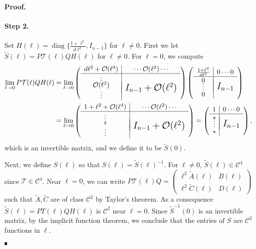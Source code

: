 \documentclass[letterpaper,11pt]{article}
\newcommand{\rmO}{\mathcal{O}}
\newcommand{\diag}{\operatorname{diag}}
\numberwithin{equation}{section}
\theoremstyle{plain}
\theoremstyle{remark}
\newenvironment{Proof}[1][.]%
 {\begin{trivlist}\item[]\textbf{Proof#1 }}%
 {\hspace*{\fill}$\rule{0.3\baselineskip}{0.35\baselineskip}$\end{trivlist}}
\begin{document}
\begin{Proof}
\paragraph{Step 2.} Set $
H(\ell) = \diag\{\frac{1+\ell^2}{d\ell^2}, I_{n-1}\}$ for $\ell \neq 0$. First we let $\tilde{S}(\ell) = P\mathcal{T}(\ell)Q H(\ell) $
for $\ell \neq 0$. For $\ell = 0$, we compute
\begin{align*}
\lim_{\ell \to 0} P\mathcal{T}(\ell)QH(\ell) &=\lim_{\ell \to 0} \left(
\begin{array}{c|c}
  d\ell^2+\rmO(\ell^4) &  \cdots \rmO(\ell^2)\cdots \\ \hline
  \vdots & \raisebox{-10pt}{{\Large\mbox{{$I_{n-1}+\rmO(\ell^2)$}}}} \\[-4ex]
  \rmO(\ell^2) & \\[-0.5ex]
  \vdots &
\end{array}\right)\left(
\begin{array}{c|c}
  \frac{1+\ell^2}{d\ell^2} & 0 \cdots 0 \\ \hline
  0 & \raisebox{-10pt}{{\Large\mbox{{$I_{n-1}$}}}} \\[-4ex]
  \vdots & \\[-0.5ex]
  0 &
\end{array}\right)\\
&=\lim_{\ell \to 0}\left(
\begin{array}{c|c}
  1+\ell^2+\rmO(\ell^4) &  \cdots \rmO(\ell^2)\cdots \\ \hline
  \vdots & \raisebox{-10pt}{{\Large\mbox{{$I_{n-1}+\rmO(\ell^2)$}}}} \\[-4ex]
  \ast & \\[-0.5ex]
  \vdots &
\end{array}\right)=\left(
\begin{array}{c|c}
  1 & 0 \cdots 0 \\ \hline
  * & \raisebox{-10pt}{{\Large\mbox{{$I_{n-1}$}}}} \\[-4ex]
  \vdots & \\[-0.5ex]
  * &
\end{array}\right),
\end{align*} 
which is an invertible matrix, and we define it to be $\tilde{S}(0)$.

Next, we define $S(\ell)$ so that $S(\ell) = \tilde{S}(\ell)^{-1}$. For $\ell \neq 0$, $\tilde{S}(\ell) \in \mathscr{C}^4$ since $\mathcal{T} \in \mathscr{C}^4$. Near $\ell = 0$, we can write $P\mathcal{T}(\ell)Q = \begin{pmatrix}
\ell^2\tilde{A}(\ell)&B(\ell)\\
\ell^2\tilde{C}(\ell)&D(\ell)
\end{pmatrix}$ such that $\tilde{A},\tilde{C}$ are of class $\mathscr{C}^2$ by Taylor's theorem. As a consequence $\tilde{S}(\ell)= PT(\ell)QH(\ell)$ is $\mathscr{C}^2$ near $\ell = 0$. Since $\tilde{S}^{-1}(0)$ is an invertible matrix, by the implicit function theorem, we conclude that the entries of $S$ are $\mathscr{C}^2$ functions in $\ell$.
 

\end{Proof}
\end{document}
